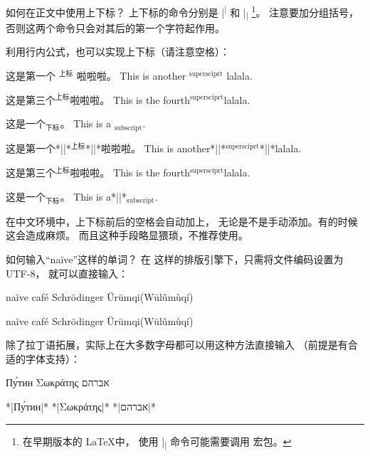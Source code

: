 \begin{myQA}{如何在正文中使用上下标？}
上下标的命令分别是 \code|\textsuperscript|
和 \code|\textsubscript|
\footnote{在早期版本的 \LaTeX 中，
	使用 \code|\textsubscript| 命令可能需要调用
	  宏包。}。
注意要加分组括号，否则这两个命令只会对其后的第一个字符起作用。

利用行内公式，也可以实现上下标（请注意空格）：
\begin{myExampleV}
{\vspace{1 ex}

这是第一个 $^\text{上标}$ 啦啦啦。
This is another $^\text{supersciprt}$ lalala.

这是第三个$^\text{上标}$啦啦啦。
This is the fourth$^\text{supersciprt}$lalala.

这是一个$_\text{下标}$。
This is a $_\text{subscript}$.}
这是第一个*|\vispace|*$^\text{上标}$*|\vispace|*啦啦啦。
This is another*|\vispace|*$^\text{supersciprt}$*|\vispace|*lalala.

这是第三个$^\text{上标}$啦啦啦。
This is the fourth$^\text{supersciprt}$lalala.

这是一个$_\text{下标}$。
This is a*|\vispace|*$_\text{subscript}$.
\end{myExampleV}
在中文环境中，上下标前后的空格会自动加上，
无论是不是手动添加。有的时候这会造成麻烦。
而且这种手段略显猥琐，不推荐使用。

\end{myQA}

\begin{myQA}{如何输入“naïve”这样的单词？}
在  这样的排版引擎下，只需将文件编码设置为 UTF-8，
就可以直接输入：
\begin{myExampleV}
{\vspace{1 ex}

naïve \quad café \quad Schrödinger \quad Ürümqi(Wūlǔmùqí)}
naïve \quad café \quad Schrödinger \quad Ürümqi(Wūlǔmùqí)
\end{myExampleV}
除了拉丁语拓展，实际上在大多数字母都可以用这种方法直接输入
（前提是有合适的字体支持）：
\begin{myExampleV}
{\vspace{1 ex}

{\LinLibertine Пу́тин \quad	 Σωκράτης \quad אברהם}}
\setmainfont{Linux Libertine O}
*|{\CourierNew Пу́тин}|*     \quad  %
*|{\CourierNew Σωκράτης}|*  \quad  %
*|{\CourierNew אברהם}|*            %
\end{myExampleV}
\end{myQA}